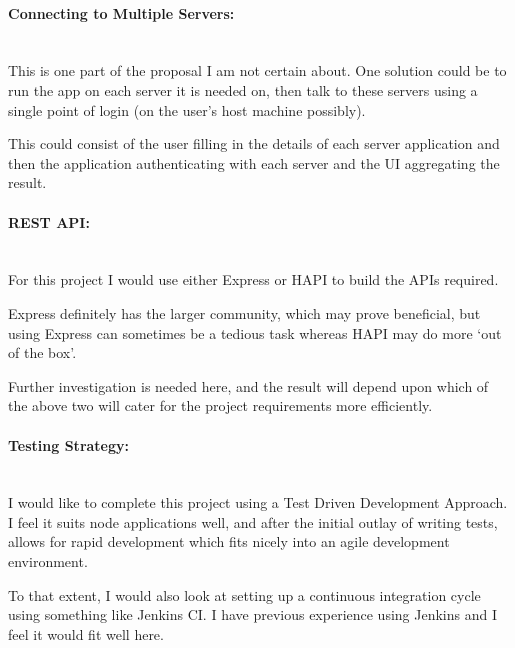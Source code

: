 \documentclass{article}
\begin{document}
\newpage

\paragraph{Connecting to Multiple Servers:}\mbox{}\\
This is one part of the proposal I am not certain about. One solution could be to run the app on each server it is needed on, then talk to these servers using a single point of login (on the user's host machine possibly). 

This could consist of the user filling in the details of each server application and then the application authenticating with each server and the UI aggregating the result. 

\paragraph{REST API:}\mbox{}\\
For this project I would use either Express or HAPI to build the APIs required. 

Express definitely has the larger community, which may prove beneficial, but using Express can sometimes be a tedious task whereas HAPI may do more `out of the box'.

Further investigation is needed here, and the result will depend upon which of the above two will cater for the project requirements more efficiently.

\paragraph{Testing Strategy:}\mbox{}\\
I would like to complete this project using a Test Driven Development Approach. I feel it suits node applications well, and after the initial outlay of writing tests, allows for rapid development which fits nicely into an agile development environment.

To that extent, I would also look at setting up a continuous integration cycle using something like Jenkins CI. I have previous experience using Jenkins and I feel it would fit well here. 


\newpage
\end{document}
